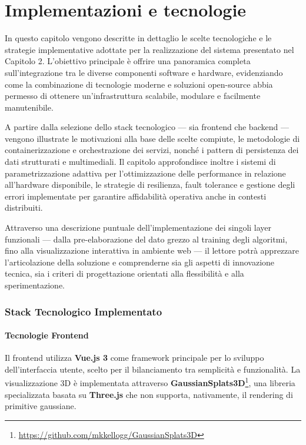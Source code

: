 \chapter{Implementazioni e tecnologie}
\label{chap:implementazione}

In questo capitolo vengono descritte in dettaglio le scelte tecnologiche e le strategie implementative adottate per la realizzazione del sistema presentato nel Capitolo 2. L’obiettivo principale è offrire una panoramica completa sull’integrazione tra le diverse componenti software e hardware, evidenziando come la combinazione di tecnologie moderne e soluzioni open-source abbia permesso di ottenere un’infrastruttura scalabile, modulare e facilmente manutenibile.

A partire dalla selezione dello stack tecnologico — sia frontend che backend — vengono illustrate le motivazioni alla base delle scelte compiute, le metodologie di containerizzazione e orchestrazione dei servizi, nonché i pattern di persistenza dei dati strutturati e multimediali. Il capitolo approfondisce inoltre i sistemi di parametrizzazione adattiva per l’ottimizzazione delle performance in relazione all’hardware disponibile, le strategie di resilienza, fault tolerance e gestione degli errori implementate per garantire affidabilità operativa anche in contesti distribuiti.

Attraverso una descrizione puntuale dell’implementazione dei singoli layer funzionali — dalla pre-elaborazione del dato grezzo al training degli algoritmi, fino alla visualizzazione interattiva in ambiente web — il lettore potrà apprezzare l’articolazione della soluzione e comprenderne sia gli aspetti di innovazione tecnica, sia i criteri di progettazione orientati alla flessibilità e alla sperimentazione.



\subsection{Stack Tecnologico Implementato}

\subsubsection{Tecnologie Frontend}

Il frontend utilizza \textbf{Vue.js 3} come framework principale per lo sviluppo dell'interfaccia utente, scelto per il bilanciamento tra semplicità e funzionalità. La visualizzazione 3D è implementata attraverso \textbf{GaussianSplats3D}\footnote{\url{https://github.com/mkkellogg/GaussianSplats3D}}, una libreria specializzata basata su \textbf{Three.js} che non supporta, nativamente, il rendering di primitive gaussiane.

